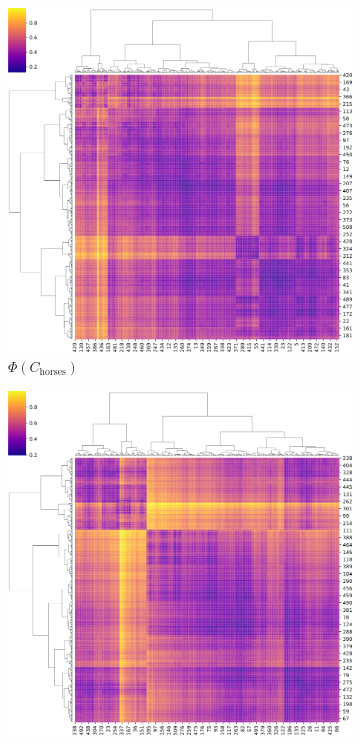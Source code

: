 \begin{figure}
    \centering
    \begin{subfigure}{0.3\textwidth}
        \centering
        \includegraphics[width=\linewidth]{figures/horses_h_scores_ward_20210804-002107.png}
        \caption{$\Phi(C_{\text{horses}})$}
    \end{subfigure}
    \begin{subfigure}{0.3\textwidth}
        \centering
        \includegraphics[width=\linewidth]{figures/bears_h_scores_ward_20210804-002107.png}

\end{subfigure}
\end{figure}
